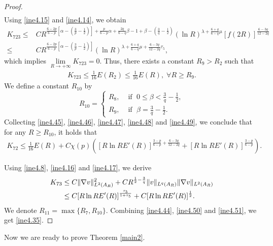 \documentclass[11pt,reqno]{amsart}
\numberwithin{Thm}{section}
\begin{document}
\begin{proof}
\begin{align}
\end{align}
Using \eqref{ine4.15} and \eqref{ine4.14}, we obtain
\begin{align*}
K_{723}\leq&CR^{\frac{6-2p}{6-p}\left[\alpha-\left(\frac{3}{p}-\frac{1}{2}\right)\right]+\frac{p}{6-p}\alpha+\frac{2q}{6-q}\beta-1+\beta-\left(\frac{3}{q}-\frac{1}{2}\right)}(\ln R)^{\lambda+\frac{6+q}{6-q}\mu} \left[f(2R)\right]^{\frac{6-3q}{12-2q}}\\
\leq&CR^{\frac{6-2p}{6-p}\left[\alpha-\left(\frac{3}{p}-\frac{1}{2}\right)\right]}(\ln R)^{\lambda+\frac{6+q}{6-q}\mu+\frac{6-3q}{12-2q}\tau_5},
\end{align*}
which implies $\lim\limits_{R\rightarrow+\infty}K_{723}=0$.
Thus, there exists a constant $R_9>R_2$ such that
\begin{align}\label{ine4.49}
	K_{723}\leq\frac{1}{16}E(R_2)\leq \frac{1}{16}E(R),\;\forall R\geq R_9.
\end{align}
We define a constant $R_{10}$ by
\begin{equation*}
R_{10}=
\begin{cases}
R_8, & \text{ if  }\;0\leq\beta<\frac{3}{q}-\frac{1}{2}, \\
R_9, & \text{ if  }\;\beta=\frac{3}{q}-\frac{1}{2}.
\end{cases}
\end{equation*}
Collecting \eqref{ine4.45}, \eqref{ine4.46}, \eqref{ine4.47}, \eqref{ine4.48} and \eqref{ine4.49},
we conclude that for any $R\geq R_{10}$, it holds that
\begin{align}\label{ine4.50}
K_{72}\leq \frac{1}{16}E(R)+C\chi(p)\left(\left[R\ln RE'(R)\right]^{\frac{3-p}{6-p}+\frac{6-3q}{12-2q}}+\left[R\ln RE'(R)\right]^{\frac{3-p}{6-p}}\right).
\end{align}

Using \eqref{ine4.8}, \eqref{ine4.16} and \eqref{ine4.17}, we derive
\begin{align}\label{ine4.51}
	K_{73} &\leq C\|\nabla v\|_{L^2 (A_R)}^2+CR^{\frac{1}{2}-\frac{3}{q}}\|v\|_{L^q(A_R)}\|\nabla v\|_{L^2 (A_R)}\notag\\
           &\leq C[R\ln RE'(R)]^\frac{\tau_5}{1+\tau_5}+C[R\ln RE'(R)]^\frac{1}{2}.
\end{align}
We denote $R_{11}=\max\{R_7,R_{10}\}$. Combining \eqref{ine4.44}, \eqref{ine4.50} and \eqref{ine4.51}, we get \eqref{ine4.35}.
\end{proof}


Now we are ready to prove Theorem \ref{main2}.
\end{document}
